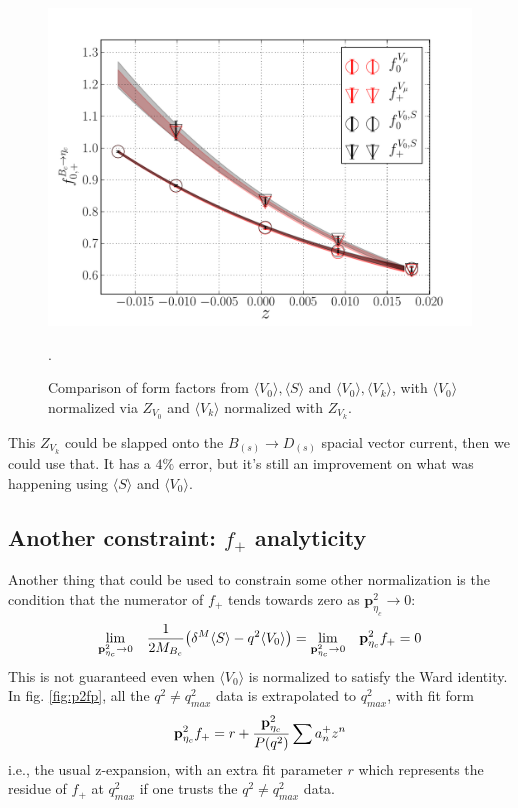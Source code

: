 \begin{figure}[htb!]
\centering
\includegraphics[scale=0.65]{images/NRQCD/Bcetac_bothways_withZVk.pdf}
\caption{Comparison of form factors from $\langle V_0 \rangle, \langle S \rangle$ and $\langle V_0 \rangle,\langle V_k \rangle$, with $\langle V_0 \rangle$ normalized via $Z_{V_0}$ and $\langle V_k \rangle$ normalized with $Z_{V_k}$.}.
\label{fig:ZVk}
\end{figure}
This $Z_{V_k}$ could be slapped onto the $B_{(s)}\to D_{(s)}$ spacial vector current, then we could use that. It has a $4\%$ error, but it's still an improvement on what was happening using $\langle S \rangle$ and $\langle V_0 \rangle$.

\subsection{Another constraint: $f_+$ analyticity}

{}

Another thing that could be used to constrain some other normalization is the condition that the numerator of $f_+$ tends towards zero as ${\textbf{p}}^2_{\eta_c}\to 0$:
\begin{align}
	\displaystyle{\lim_{{\textbf{p}}_{\eta_c}^2\to 0}}\quad {1\over2M_{B_c}}\big( \delta^M  \langle S \rangle - q^2 \langle V_0 \rangle \big) = \displaystyle{\lim_{{\textbf{p}}_{\eta_c}^2\to 0}} \quad {\textbf{p}}^2_{\eta_c}f_+ = 0
\end{align}
This is not guaranteed even when $\langle V_0 \rangle$ is normalized to satisfy the Ward identity. In fig. \ref{fig:p2fp}, all the $q^2\neq q^2_{max}$ data is extrapolated to $q^2_{max}$, with fit form
\begin{align}
	{\textbf{p}}^2_{\eta_c}f_+ = r + {{\textbf{p}}^2_{\eta_c} \over P(q^2)}\sum a^+_n z^n
\end{align}
i.e., the usual z-expansion, with an extra fit parameter $r$ which represents the residue of $f_+$ at $q^2_{max}$ if one trusts the $q^2\neq q^2_{max}$ data.

